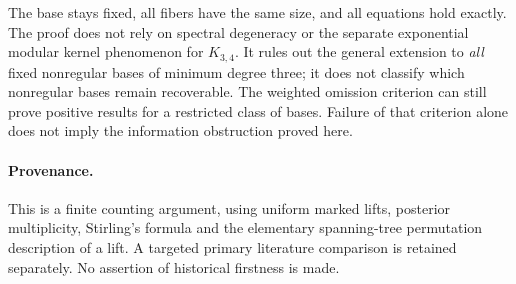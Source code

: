 \documentclass[11pt]{article}
\begin{document}
The base stays fixed, all fibers have the same size, and all equations
hold exactly. The proof does not rely on spectral degeneracy or the
separate exponential modular kernel phenomenon for $K_{3,4}$.
It rules out the general extension
to \emph{all} fixed nonregular bases of minimum degree three; it
does not classify which nonregular bases remain recoverable.
The weighted omission criterion can still prove positive results
for a restricted class of bases. Failure of that criterion alone
does not imply the information obstruction proved here.

\paragraph{Provenance.}
This is a finite counting argument, using uniform marked lifts,
posterior multiplicity, Stirling's formula and the elementary
spanning-tree permutation description of a lift. A targeted primary
literature comparison is retained separately. No assertion of
historical firstness is made.
\end{document}
